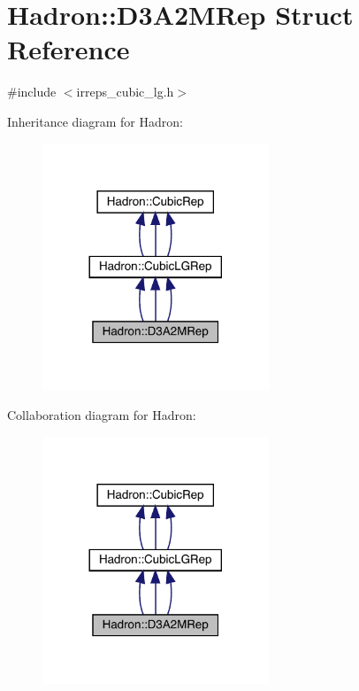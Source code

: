 \hypertarget{structHadron_1_1D3A2MRep}{}\section{Hadron\+:\+:D3\+A2\+M\+Rep Struct Reference}
\label{structHadron_1_1D3A2MRep}


{\ttfamily \#include $<$irreps\+\_\+cubic\+\_\+lg.\+h$>$}



Inheritance diagram for Hadron\+:
\nopagebreak
\begin{figure}[H]
\begin{center}
\leavevmode
\includegraphics[width=192pt]{d2/d99/structHadron_1_1D3A2MRep__inherit__graph}
\end{center}
\end{figure}


Collaboration diagram for Hadron\+:
\nopagebreak
\begin{figure}[H]
\begin{center}
\leavevmode
\includegraphics[width=192pt]{d6/d56/structHadron_1_1D3A2MRep__coll__graph}
\end{center}
\end{figure}
